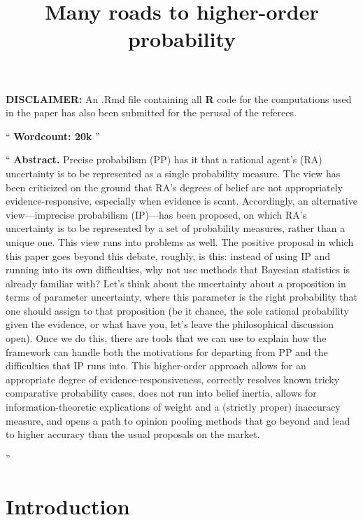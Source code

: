 \documentclass[
  10pt,
  dvipsnames,enabledeprecatedfontcommands]{scrartcl}
\title{Many roads to higher-order probability}
\author{}
\date{\vspace{-2.5em}}
\renewenvironment{quote}
{\list{}{\leftmargin=1em\rightmargin=1em}\item[]``}
{''\endlist}
\begin{document}
\maketitle

\textbf{DISCLAIMER:} An .Rmd file containing all \textbf{\textsf{R}}
code for the computations used in the paper has also been submitted for
the perusal of the referees.

\begin{quote}
\textbf{Wordcount: 20k}
\end{quote}

\begin{quote}
\textbf{Abstract.} Precise probabilism (PP) has it that   a rational agent's (RA)  uncertainty is to be represented as a single probability measure. The view has been criticized on the ground that RA's degrees of belief are not appropriately evidence-responsive, especially when evidence is scant. Accordingly, an alternative view---imprecise probabilism (IP)---has been proposed, on which RA's uncertainty is to be represented by a set of probability measures, rather than a unique one. This view runs into problems as well. The positive proposal in which this paper goes beyond this debate, roughly, is this: instead of using IP and running into its own difficulties, why not use methods that Bayesian statistics is already familiar with? Let's think about the uncertainty about a proposition in terms of parameter uncertainty, where this parameter is the right probability that one should assign to that proposition (be it chance, the sole rational probability given the evidence, or what have you, let's leave the philosophical discussion open). Once we do this, there are tools that we can use to explain how the framework can handle both the motivations for departing from PP and the difficulties that IP runs into. This higher-order approach allows for an appropriate degree of evidence-responsiveness, correctly resolves known tricky comparative probability cases, does not run into belief inertia, allows for information-theoretic explications of weight and a (strictly proper) inaccuracy measure, and opens a path to opinion pooling methods that go beyond and lead to higher accuracy than the usual proposals on the market. 

\end{quote}

\hypertarget{introduction}{%
\section{Introduction}\label{introduction}}
\end{document}
